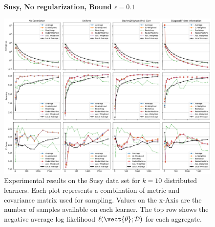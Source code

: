 \begin{landscape}
    \begin{figure}
        \centering
        \textbf{Susy, No regularization, Bound $\epsilon=0.1$}\par\medskip
        \includegraphics[height=\dimexpr \textheight - 1\baselineskip\relax]{kapitel/figures/susy_None_0.1.pdf}
        \caption[Susy plots without regularization and $\epsilon=0.1$]{Experimental results on the Susy data set for $k=10$ distributed learners. Each plot represents a combination of metric and covariance matrix used for sampling. Values on the x-Axis are the number of samples available on each learner. The top row shows the negative average log likelihood $\ell(\tilde{\vect{\theta}}; \mathcal{D})$ for each aggregate.}
        \label{fig:analysis4}
    \end{figure}
    \end{landscape}
